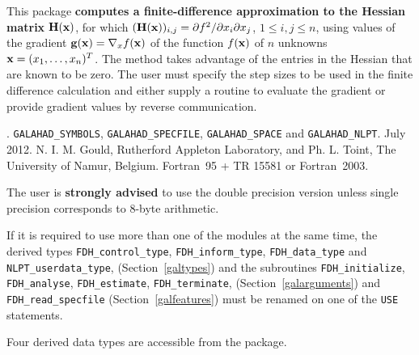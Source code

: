 \documentclass{galahad}
\newcommand{\packagename}{FDH}
\newcommand{\fullpackagename}{\libraryname\_\packagename}
\begin{document}
\galheader


\galsummary
This package 
{\bf computes a finite-difference approximation to the Hessian matrix} 
${\mathbf{H}}({\mathbf{x}})$, for which  
$({\mathbf{H}}({\mathbf{x}}))_{i,j} = \partial f^2 / \partial x_i \partial x_j$,
$1 \leq i, j \leq n$,  
using values of the gradient ${\mathbf{g}}({\mathbf{x}}) = \nabla_x f({\mathbf{x}})$ 
of the function $f({\mathbf{x}})$ of $n$ unknowns ${\mathbf{x}} = (x_1, \ldots, x_n)^T$. 
The method takes advantage of the entries in the Hessian that are known to
be zero.  The user must specify the step sizes to be used in the
finite difference calculation and either supply a routine to evaluate
the gradient or provide gradient values by reverse communication.


\galattributes
\galversions{\tt  \fullpackagename\_single, \fullpackagename\_double}.
\galuses 
{\tt GALAHAD\_SY\-M\-BOLS}, 
{\tt GALAHAD\_SP\-ECFILE},
{\tt GALAHAD\_SPACE} and
{\tt GALAHAD\_NLPT}.
\galdate July 2012.
\galorigin N. I. M. Gould, Rutherford Appleton Laboratory,
and Ph. L. Toint, The University of Namur, Belgium.
\gallanguage Fortran~95 + TR 15581 or Fortran~2003. 


\galhowto



The user is {\bf strongly advised} to use the double
precision version unless single precision corresponds to 8-byte arithmetic.

\noindent
If it is required to use more than one of the modules at the same time, 
the derived types
{\tt \packagename\_control\_type}, 
{\tt \packagename\_inform\_type},
{\tt \packagename\_data\_type}
and
{\tt NLPT\_userdata\_type},
(Section~\ref{galtypes})
and the subroutines
{\tt \packagename\_initialize}, 
{\tt \packagename\_\-analyse},
{\tt \packagename\_\-estimate},
{\tt \packagename\_terminate},
(Section~\ref{galarguments})
and 
{\tt \packagename\_read\_specfile}
(Section~\ref{galfeatures})
must be renamed on one of the {\tt USE} statements.





\galtypes
Four derived data types are accessible from the package.
\end{document}
